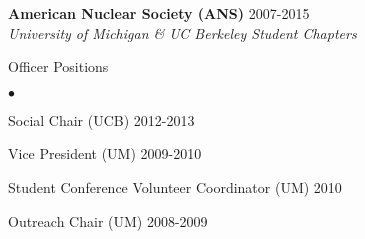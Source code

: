 \documentclass[margin,line]{res}
\newenvironment{list1}{
  \begin{list}{\ding{113}}{%
      \setlength{\itemsep}{0in}
      \setlength{\parsep}{0in} \setlength{\parskip}{0in}
      \setlength{\topsep}{0in} \setlength{\partopsep}{0in} 
      \setlength{\leftmargin}{0.17in}}}{\end{list}}
\newenvironment{list2}{
  \begin{list}{$\bullet$}{%
      \setlength{\itemsep}{0in}
      \setlength{\parsep}{0in} \setlength{\parskip}{0in}
      \setlength{\topsep}{0in} \setlength{\partopsep}{0in} 
      \setlength{\leftmargin}{0.2in}}}{\end{list}}
\begin{document}
\begin{resume}
{\bf American Nuclear Society (ANS)} \hfill 2007-2015 \\
{\em University of Michigan \& UC Berkeley Student Chapters} 

\begin{list1}
  \item[] Officer Positions
  \begin{list2}
    \item Social Chair (UCB) \hfill 2012-2013
    \item Vice President (UM) \hfill 2009-2010
    \item Student Conference Volunteer Coordinator (UM) \hfill 2010
    \item Outreach Chair (UM) \hfill 2008-2009
  \end{list2}
\end{list1}


%

\end{resume}
\end{document}
